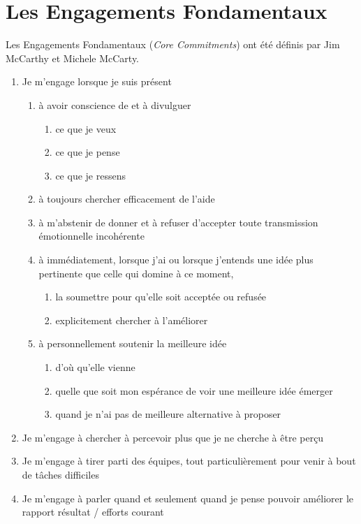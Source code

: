 \documentclass[11pt]{book}
\begin{document}
\chapter{Les Engagements Fondamentaux} \label{engagements}

Les Engagements Fondamentaux (\emph{Core Commitments}) ont été définis par Jim McCarthy et Michele McCarty.

\begin{enumerate}
	\item Je m'engage lorsque je suis présent
	\begin{enumerate}
		\item à avoir conscience de et à divulguer
		\begin{enumerate}
			\item ce que je veux
			\item ce que je pense
			\item ce que je ressens
		\end{enumerate}
		\item à toujours chercher efficacement de l'aide
		\item à m'abstenir de donner et à refuser d'accepter toute transmission émotionnelle incohérente
		\item à immédiatement, lorsque j'ai ou lorsque j'entends une idée plus pertinente que celle qui domine
		      à ce moment,
		\begin{enumerate}
			\item la soumettre pour qu'elle soit acceptée ou refusée
			\item explicitement chercher à l'améliorer
		\end{enumerate}
		\item à personnellement soutenir la meilleure idée
		\begin{enumerate}
			\item d'où qu'elle vienne
			\item quelle que soit mon espérance de voir une meilleure idée émerger
			\item quand je n'ai pas de meilleure alternative à proposer
		\end{enumerate}
	\end{enumerate}
	\item Je m'engage à chercher à percevoir plus que je ne cherche à être perçu
	\item Je m'engage à tirer parti des équipes, tout particulièrement pour venir à bout de tâches difficiles
	\item Je m'engage à parler quand et seulement quand je pense pouvoir améliorer le rapport résultat / efforts courant

\end{enumerate}
\end{document}
